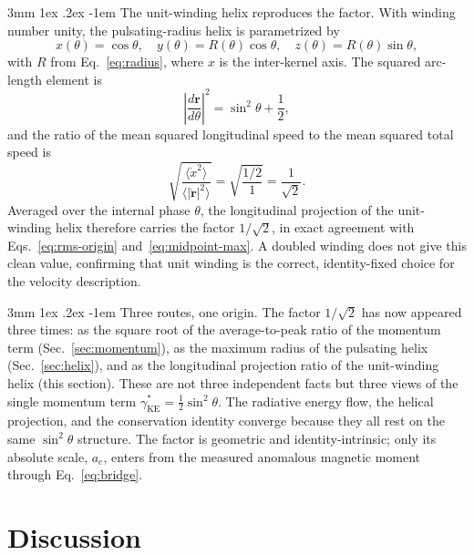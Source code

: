 \documentclass[%
 reprint, amsmath,amssymb, aps, prb, ]{revtex4-2}
\makeatletter
\numberwithin{equation}{section}
\renewcommand\paragraph{%
  \@startsection{paragraph}{4}{\z@}%
    {3mm \@plus 1ex \@minus .2ex}%
    {-1em}%
    {\normalfont\normalsize\itshape}}
\newcommand{\gKE}{\gamma^{*}_{\text{KE}}}
\makeatother
\begin{document}
\paragraph{The unit-winding helix reproduces the factor.}
With winding number unity, the pulsating-radius helix is parametrized by
\begin{equation}
x(\theta)=\cos\theta,\quad y(\theta)=R(\theta)\cos\theta,\quad z(\theta)=R(\theta)\sin\theta,
\label{eq:helix-param}
\end{equation}
with $R$ from Eq.~\eqref{eq:radius}, where $x$ is the inter-kernel axis. The squared arc-length element is
\begin{equation}
\left\lvert\frac{d\mathbf{r}}{d\theta}\right\rvert^2 = \sin^2\theta + \frac{1}{2},
\label{eq:arclength}
\end{equation}
and the ratio of the mean squared longitudinal speed to the mean squared total speed is
\begin{equation}
\sqrt{\frac{\langle \dot{x}^2\rangle}{\langle \lvert\dot{\mathbf{r}}\rvert^2\rangle}} = \sqrt{\frac{1/2}{1}} = \frac{1}{\sqrt{2}}.
\label{eq:projection}
\end{equation}
Averaged over the internal phase $\theta$, the longitudinal projection of the unit-winding helix therefore carries the factor $1/\sqrt{2}$, in exact agreement with Eqs.~\eqref{eq:rms-origin} and~\eqref{eq:midpoint-max}. A doubled winding does not give this clean value, confirming that unit winding is the correct, identity-fixed choice for the velocity description.

\paragraph{Three routes, one origin.}
The factor $1/\sqrt{2}$ has now appeared three times: as the square root of the average-to-peak ratio of the momentum term (Sec.~\ref{sec:momentum}), as the maximum radius of the pulsating helix (Sec.~\ref{sec:helix}), and as the longitudinal projection ratio of the unit-winding helix (this section). These are not three independent facts but three views of the single momentum term $\gKE=\tfrac{1}{2}\sin^2\theta$. The radiative energy flow, the helical projection, and the conservation identity converge because they all rest on the same $\sin^2\theta$ structure. The factor is geometric and identity-intrinsic; only its absolute scale, $a_e$, enters from the measured anomalous magnetic moment through Eq.~\eqref{eq:bridge}.

\section{Discussion}
\label{sec:discussion}
\end{document}
